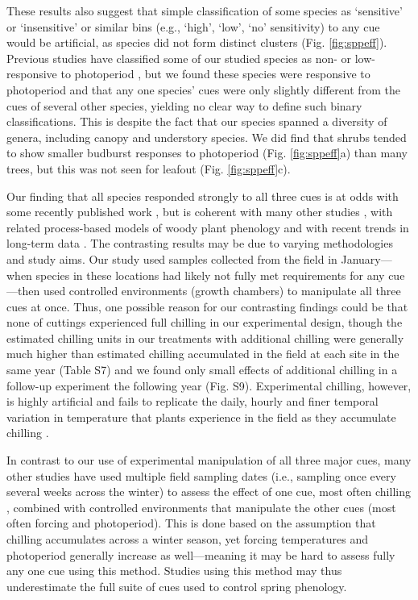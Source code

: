 \documentclass[11pt]{article}
\begin{document}
These results also suggest that simple classification of some species as `sensitive' or `insensitive' or similar bins (e.g., `high', `low', `no' sensitivity) to any cue would be artificial, as species did not form distinct clusters (Fig. \ref{fig:sppeff}). Previous studies have classified some of our studied species as non- or low-responsive to photoperiod \citep[e.g., \emph{Alnus incana, Aronia melanocarpa in}][]{zohner2016ncc}, but we found these species were responsive to photoperiod and that any one species' cues were only slightly different from the cues of several other species, yielding no clear way to define such binary classifications. This is despite the fact that our species spanned a diversity of genera, including canopy and understory species. We did find that shrubs tended to show smaller budburst responses to photoperiod (Fig. \ref{fig:sppeff}a) than many trees, but this was not seen for leafout (Fig. \ref{fig:sppeff}c). 

Our finding that all species responded strongly to all three cues is at odds with some recently published work \citep{Basler:2012aa,laube2014gcb,zohner2016ncc}, but is coherent with many other studies \citep[e.g.,][]{Worrall:1967aa,Heide:1993b}, with related process-based models of woody plant phenology \citep{Chuine:2000,chuine2016} and with recent trends in long-term data \citep[e.g,][]{fu2015,carter2017}. The contrasting results may be due to varying methodologies and study aims. Our study used samples collected from the field in January---when species in these locations had likely not fully met requirements for any cue---then used controlled environments (growth chambers) to manipulate all three cues at once. Thus, one possible reason for our contrasting findings could be that none of cuttings experienced full chilling in our experimental design, though the estimated chilling units in our treatments with additional chilling were generally much higher than estimated chilling accumulated in the field at each site in the same year (Table S7) and we found only small effects of additional chilling in a follow-up experiment the following year (Fig. S9). Experimental chilling, however, is highly artificial and fails to replicate the daily, hourly and finer temporal variation in temperature that plants experience in the field as they accumulate chilling \citep{Erez:1988,Luedeling:2009}. 

In contrast to our use of experimental manipulation of all three major cues, many other studies have used multiple field sampling dates (i.e., sampling once every several weeks across the winter) to assess the effect of one cue, most often chilling \citep{weinberger,laube2014gcb,zohner2017}, combined with controlled environments that manipulate the other cues (most often forcing and photoperiod). This is done based on the assumption that chilling accumulates across a winter season, yet forcing temperatures and photoperiod generally increase as well---meaning it may be hard to assess fully any one cue using this method. Studies using this method may thus underestimate the full suite of cues used to control spring phenology. 
\end{document}
